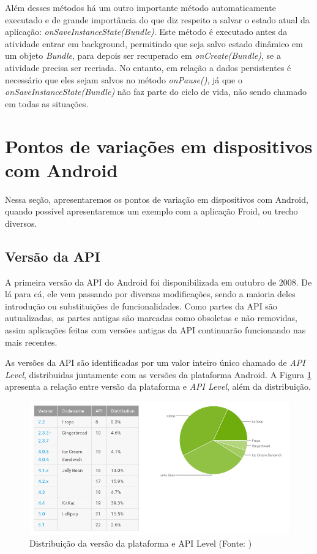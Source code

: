 Além desses métodos há um outro importante método automaticamente executado e de 
grande importância do que diz respeito a salvar o estado atual da aplicação: 
{\it onSaveInstanceState(Bundle)}. Este método é executado antes da atividade entrar em 
background, permitindo que seja salvo estado dinâmico em um objeto {\it Bundle}, para depois 
ser recuperado em {\it onCreate(Bundle)}, se a atividade precisa ser recriada. No entanto,
em relação a dados persistentes é necessário que eles sejam salvos no método {\it onPause()}, 
já que o {\it onSaveInstanceState(Bundle)} não faz parte do ciclo de vida, não sendo chamado 
em todas as situações.

\section{Pontos de variações em dispositivos com Android}

Nessa seção, apresentaremos os pontos de variação em dispositivos com Android,
quando possível apresentaremos um exemplo com a aplicação Froid, ou trecho diversos.

\subsection{Versão da API}

A primeira versão da API do Android foi disponibilizada em outubro de 2008. De lá 
para cá, ele vem passando por diversas modificações, sendo a maioria deles 
introdução ou substituições de funcionalidades. Como partes da API são autualizadas, 
as partes antigas são marcadas como obsoletas e não removidas, assim aplicações feitas
com versões antigas da API continuarão funcionando nas mais recentes.

As versões da API são identificadas por um valor inteiro único chamado de {\it API Level},
distribuidas juntamente com as versões da plataforma Android. A Figura \ref{api_level} 
apresenta a relação entre versão da plataforma e {\it API Level}, além da distribuição.

\begin{figure}[h]
    \centering
    \includegraphics[width=15cm]{img/api_level}
    \caption[Distribuição da versão da plataforma e API Level]{Distribuição da versão
    da plataforma e API Level (Fonte: \cite{platform_versions}) }
    \label{api_level}
\end{figure}

